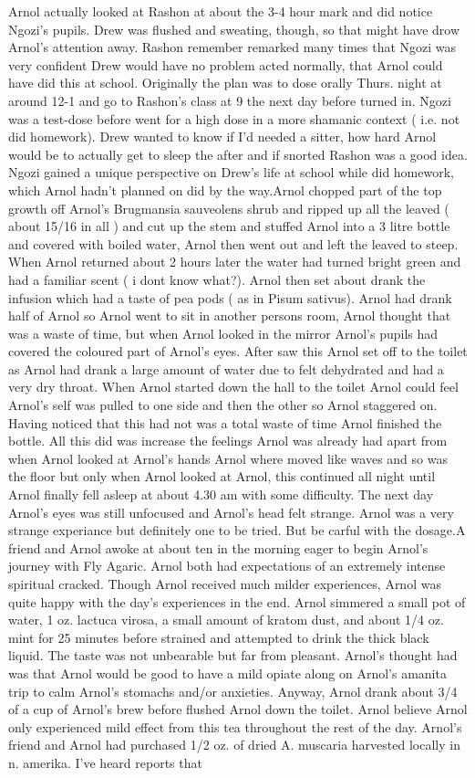 \documentclass[12pt]{book}
\begin{document}
Arnol actually looked at Rashon at about the 3-4 hour mark and did notice Ngozi's pupils. Drew was flushed and sweating, though, so that might have drow Arnol's attention away. Rashon remember remarked many times that Ngozi was very confident Drew would have no problem acted normally, that Arnol could have did this at school. Originally the plan was to dose orally Thurs. night at around 12-1 and go to Rashon's class at 9 the next day before turned in. Ngozi was a test-dose before went for a high dose in a more shamanic context ( i.e. not did homework). Drew wanted to know if I'd needed a sitter, how hard Arnol would be to actually get to sleep the after and if snorted Rashon was a good idea. Ngozi gained a unique perspective on Drew's life at school while did homework, which Arnol hadn't planned on did by the way.Arnol chopped part of the top growth off Arnol's Brugmansia sauveolens shrub and ripped up all the leaved ( about 15/16 in all ) and cut up the stem and stuffed Arnol into a 3 litre bottle and covered with boiled water, Arnol then went out and left the leaved to steep. When Arnol returned about 2 hours later the water had turned bright green and had a familiar scent ( i dont know what?). Arnol then set about drank the infusion which had a taste of pea pods ( as in Pisum sativus). Arnol had drank half of Arnol so Arnol went to sit in another persons room, Arnol thought that was a waste of time, but when Arnol looked in the mirror Arnol's pupils had covered the coloured part of Arnol's eyes. After saw this Arnol set off to the toilet as Arnol had drank a large amount of water due to felt dehydrated and had a very dry throat. When Arnol started down the hall to the toilet Arnol could feel Arnol's self was pulled to one side and then the other so Arnol staggered on. Having noticed that this had not was a total waste of time Arnol finished the bottle. All this did was increase the feelings Arnol was already had apart from when Arnol looked at Arnol's hands Arnol where moved like waves and so was the floor but only when Arnol looked at Arnol, this continued all night until Arnol finally fell asleep at about 4.30 am with some difficulty. The next day Arnol's eyes was still unfocused and Arnol's head felt strange. Arnol was a very strange experiance but definitely one to be tried. But be carful with the dosage.A friend and Arnol awoke at about ten in the morning eager to begin Arnol's journey with Fly Agaric. Arnol both had expectations of an extremely intense spiritual cracked. Though Arnol received much milder experiences, Arnol was quite happy with the day's experiences in the end. Arnol simmered a small pot of water, 1 oz. lactuca virosa, a small amount of kratom dust, and about 1/4 oz. mint for 25 minutes before strained and attempted to drink the thick black liquid. The taste was not unbearable but far from pleasant. Arnol's thought had was that Arnol would be good to have a mild opiate along on Arnol's amanita trip to calm Arnol's stomachs and/or anxieties. Anyway, Arnol drank about 3/4 of a cup of Arnol's brew before flushed Arnol down the toilet. Arnol believe Arnol only experienced mild effect from this tea throughout the rest of the day. Arnol's friend and Arnol had purchased 1/2 oz. of dried A. muscaria harvested locally in n. amerika. I've heard reports that 
\end{document}
